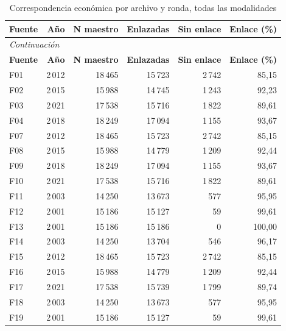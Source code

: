 \begingroup\small
\setlength{\tabcolsep}{4pt}
\begin{longtable}{lrrrrr}
\caption{Correspondencia económica por archivo y ronda, todas las modalidades}\label{tab:integracion-cobertura}\\
\toprule
\textbf{Fuente} & \textbf{Año} & \textbf{N maestro} & \textbf{Enlazadas} & \textbf{Sin enlace} & \textbf{Enlace (\%)} \\
\midrule\endfirsthead
\multicolumn{6}{l}{\textit{Continuación}}\\
\toprule
\textbf{Fuente} & \textbf{Año} & \textbf{N maestro} & \textbf{Enlazadas} & \textbf{Sin enlace} & \textbf{Enlace (\%)} \\
\midrule\endhead
\bottomrule\endfoot
F01 & 2\,012 & 18\,465 & 15\,723 & 2\,742 & 85,15 \\
F02 & 2\,015 & 15\,988 & 14\,745 & 1\,243 & 92,23 \\
F03 & 2\,021 & 17\,538 & 15\,716 & 1\,822 & 89,61 \\
F04 & 2\,018 & 18\,249 & 17\,094 & 1\,155 & 93,67 \\
F07 & 2\,012 & 18\,465 & 15\,723 & 2\,742 & 85,15 \\
F08 & 2\,015 & 15\,988 & 14\,779 & 1\,209 & 92,44 \\
F09 & 2\,018 & 18\,249 & 17\,094 & 1\,155 & 93,67 \\
F10 & 2\,021 & 17\,538 & 15\,716 & 1\,822 & 89,61 \\
F11 & 2\,003 & 14\,250 & 13\,673 & 577 & 95,95 \\
F12 & 2\,001 & 15\,186 & 15\,127 & 59 & 99,61 \\
F13 & 2\,001 & 15\,186 & 15\,186 & 0 & 100,00 \\
F14 & 2\,003 & 14\,250 & 13\,704 & 546 & 96,17 \\
F15 & 2\,012 & 18\,465 & 15\,723 & 2\,742 & 85,15 \\
F16 & 2\,015 & 15\,988 & 14\,779 & 1\,209 & 92,44 \\
F17 & 2\,021 & 17\,538 & 15\,739 & 1\,799 & 89,74 \\
F18 & 2\,003 & 14\,250 & 13\,673 & 577 & 95,95 \\
F19 & 2\,001 & 15\,186 & 15\,127 & 59 & 99,61 \\
\end{longtable}
\endgroup
